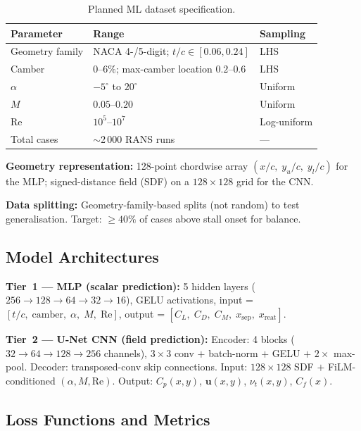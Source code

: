 \documentclass[11pt,a4paper]{article}
\begin{document}
\begin{table}[!ht]
\centering
\caption{Planned ML dataset specification.}
\begin{tabular}{lll}
\toprule
\textbf{Parameter} & \textbf{Range} & \textbf{Sampling} \\
\midrule
Geometry family & NACA 4-/5-digit; $t/c\in[0.06, 0.24]$ & LHS \\
Camber          & $0$--$6\%$; max-camber location $0.2$--$0.6$ & LHS \\
$\alpha$        & $-5^\circ$ to $20^\circ$ & Uniform \\
$M$             & $0.05$--$0.20$ & Uniform \\
Re              & $10^5$--$10^7$ & Log-uniform \\
\midrule
Total cases     & $\sim$2\,000 RANS runs & --- \\
\bottomrule
\end{tabular}
\end{table}

\noindent\textbf{Geometry representation:} 128-point chordwise array
$(x/c,\;y_u/c,\;y_l/c)$ for the MLP; signed-distance field (SDF) on a
$128\times128$ grid for the CNN.

\noindent\textbf{Data splitting:} Geometry-family-based splits (not random)
to test generalisation. Target: $\ge40\%$ of cases above stall onset for
balance.

\subsection{Model Architectures}
\label{sec:architectures}

\textbf{Tier~1 --- MLP (scalar prediction):}
5 hidden layers ($256\to128\to64\to32\to16$), GELU activations,
input = $[t/c,\;\text{camber},\;\alpha,\;M,\;\text{Re}]$,
output = $[C_L,\;C_D,\;C_M,\;x_\text{sep},\;x_\text{reat}]$.

\medskip\noindent
\textbf{Tier~2 --- U-Net CNN (field prediction):}
Encoder: 4 blocks ($32\to64\to128\to256$ channels), $3\times3$ conv $+$
batch-norm $+$ GELU $+$ $2\times$ max-pool.
Decoder: transposed-conv skip connections.
Input: $128\times128$ SDF $+$ FiLM-conditioned $(\alpha, M, \text{Re})$.
Output: $C_p(x,y)$, $\mathbf{u}(x,y)$, $\nu_t(x,y)$, $C_f(x)$.

\subsection{Loss Functions and Metrics}
\end{document}
